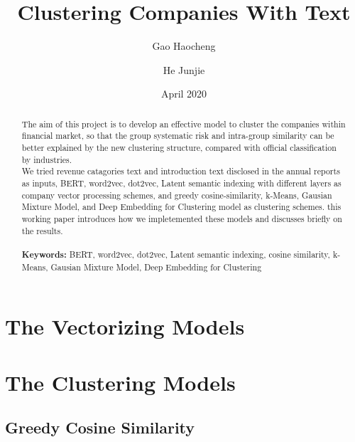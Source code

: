 \documentclass[12pt]{article}
\begin{document}
\begin{titlepage}
\title{Clustering Companies With Text}
\author{Gao Haocheng \and He Junjie}
\date{April 2020}
\maketitle
\begin{abstract}
\noindent The aim of this project is to develop an effective model to 
cluster the companies within financial market, so that the group systematic
risk and intra-group similarity can be better explained by the new clustering 
structure, compared with official classification by industries.\\
\noindent We tried revenue catagories text and introduction text disclosed in
the annual reports as inputs, BERT, word2vec, dot2vec, Latent semantic indexing with different layers 
as company vector processing schemes, and greedy cosine-similarity, k-Means, Gausian
Mixture Model, and Deep Embedding for Clustering model as clustering schemes. this
working paper introduces how we impletemented these models and discusses briefly 
on the results.\\
\vspace{0in}\\
\noindent\textbf{Keywords:} BERT, word2vec, dot2vec, Latent semantic indexing, cosine similarity, 
k-Means, Gausian Mixture Model, Deep Embedding for Clustering\\

\bigskip
\end{abstract}
\setcounter{page}{0}
\thispagestyle{empty}
\end{titlepage}
\pagebreak \newpage




\doublespacing


\section{The Vectorizing Models} \label{sec:the vectorizing models}

\section{The Clustering Models} \label{sec:the clustering models}

\subsection{Greedy Cosine Similarity}
\end{document}

